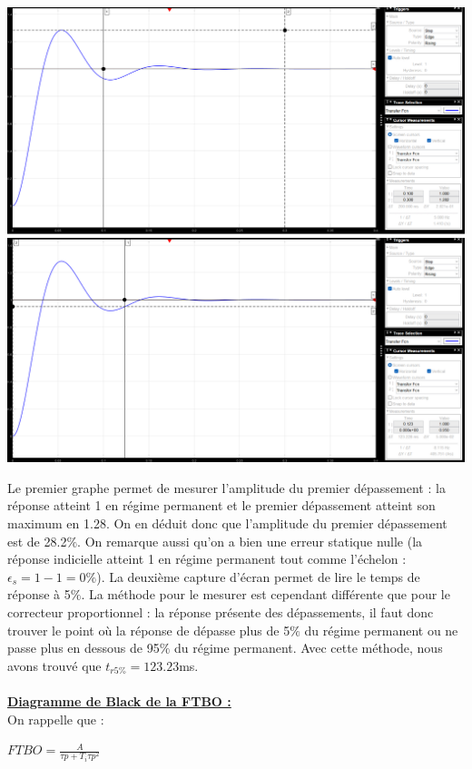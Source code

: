 \documentclass[12pt]{article}
\begin{document}
\begin{center}
    \includegraphics[width = 16 cm]{TP2 Simulink/Syst_1/depassement_syst1_Ti=tau.png}
    \includegraphics[width = 16 cm]{TP2 Simulink/Syst_1/tr5prct_syst_1_Ti=tau.png}
\end{center}
\normalsize Le premier graphe permet de mesurer l'amplitude du premier dépassement : la réponse atteint 1 en régime permanent et le premier dépassement atteint son maximum en 1.28. On en déduit donc que l'amplitude du premier dépassement est de 28.2$\%$.
On remarque aussi qu'on a bien une erreur statique nulle (la réponse indicielle atteint 1 en régime permanent tout comme l'échelon : $\epsilon_s = 1-1 = 0\%$).
La deuxième capture d'écran permet de lire le temps de réponse à 5$\%$. La méthode pour le mesurer est cependant différente que pour le correcteur proportionnel : la réponse présente des dépassements, il faut donc trouver le point où la réponse de dépasse plus de 5$\%$ du régime permanent ou ne passe plus en dessous de 95$\%$ du régime permanent.
Avec cette méthode, nous avons trouvé que $t_{r5\%} = 123.23$ms.
\\\\\underline{\bf Diagramme de Black de la FTBO :}
\\On rappelle que :
\begin{center}
    \large$FTBO = \frac{A}{\tau p + T_i\tau p^2}$
\end{center}
\end{document}
